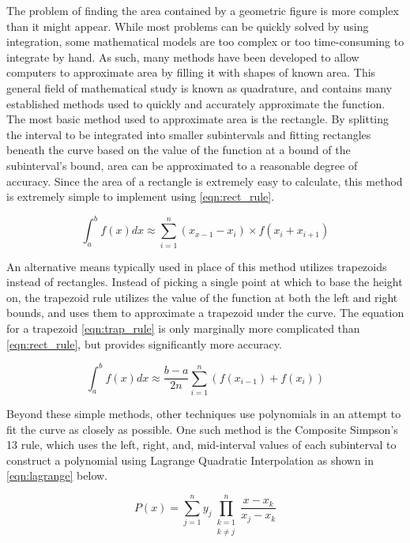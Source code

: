 \documentclass{paper}
\author{Grant Lemons}
\begin{document}

The problem of finding the area contained by a geometric figure is more complex than it might appear.
While most problems can be quickly solved by using integration, some mathematical models are too complex or too time-consuming to integrate by hand.
As such, many methods have been developed to allow computers to approximate area by filling it with shapes of known area.
This general field of mathematical study is known as quadrature, and contains many established methods used to quickly and accurately approximate the function.
The most basic method used to approximate area is the rectangle.
By splitting the interval to be integrated into smaller subintervals and fitting rectangles beneath the curve based on the value of the function at a bound of the subinterval's bound, area can be approximated to a reasonable degree of accuracy.
Since the area of a rectangle is extremely easy to calculate, this method is extremely simple to implement using \eqref{eqn:rect_rule}.

\begin{equation}
    \label{eqn:rect_rule}
    \int_a^b f(x) dx \approx \sum_{i=1}^n (x_{x-1} - x_i) \times f(x_i + x_{i+1})
\end{equation}
 
An alternative means typically used in place of this method utilizes trapezoids instead of rectangles.
Instead of picking a single point at which to base the height on, the trapezoid rule utilizes the value of the function at both the left and right bounds, and uses them to approximate a trapezoid under the curve.
The equation for a trapezoid \eqref{eqn:trap_rule} is only marginally more complicated than \eqref{eqn:rect_rule}, but provides significantly more accuracy.

\begin{equation}
    \label{eqn:trap_rule}
    \int_a^b f(x) dx \approx \dfrac{b - a}{2n} \sum_{i=1}^n (f(x_{i-1})+f(x_i))
\end{equation}

Beyond these simple methods, other techniques use polynomials in an attempt to fit the curve as closely as possible.
One such method is the Composite Simpson's 13 rule, which uses the left, right, and, mid-interval values of each subinterval to construct a polynomial using Lagrange Quadratic Interpolation as shown in \eqref{eqn:lagrange} below.

\begin{equation}
    \label{eqn:lagrange}
    P(x) = \sum_{j=1}^n y_j \prod_{\substack{k = 1 \\ k \neq j}}^n \dfrac{x - x_k}{x_j - x_k}
\end{equation}
\end{document}
